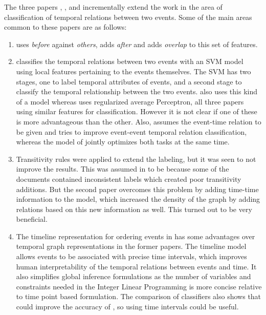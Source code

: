 The three papers \citeauthor{chju2008ec}, \citeauthor{temporalordering}, and \citeauthor{quang} incrementally extend the work in the area of classification of temporal relations between two events. Some of the main areas common to these papers are as follows:

\begin{enumerate}
\item {} \citeauthor{chju2008ec} uses {\em before} against {\em others}, \citeauthor{temporalordering} adds {\em after} and \citeauthor{quang} adds {\em overlap} to this set of features.

\item {} \citeauthor{chju2008ec} classifies the temporal relations between two events with an SVM model using local features pertaining to the events themselves. The SVM has two stages, one to label temporal attributes of events, and a  second stage to classify the temporal relationship between the two events. \citeauthor{temporalordering} also uses this kind of a model whereas \citeauthor{quang} uses  regularized average Perceptron, all three papers using similar features for classification. However it is not clear if one of these is more advantageous than the other. Also, \citeauthor{temporalordering} assumes the event-time relation to be given and tries to improve event-event temporal relation classification, whereas the model of \citeauthor{quang} jointly optimizes both tasks at the same time.

\item {} Transitivity rules were applied to extend the labeling, but it was seen to not improve the results. This was assumed in \citeauthor{chju2008ec} to be because some of the documents contained inconsistent labels which created poor transitivity additions. But the second paper overcomes this problem by adding time-time information to the model, which increased the density of the graph by adding relations based on this new information as well. This turned out to be very beneficial. 

\item {} The timeline representation for ordering events in \citeauthor{quang} has some advantages over temporal graph representations in the former papers. The timeline model allows events to be associated with precise time intervals, which improves human interpretability of the temporal relations between events and time. It also simplifies global inference formulations as the number of variables and constraints needed in the Integer Linear Programming is more concise relative to time point based formulation. The comparison of classifiers also shows that \citeauthor{quang} could improve the accuracy of \citeauthor{temporalordering}, so using time intervals could be useful.


\end{enumerate}
